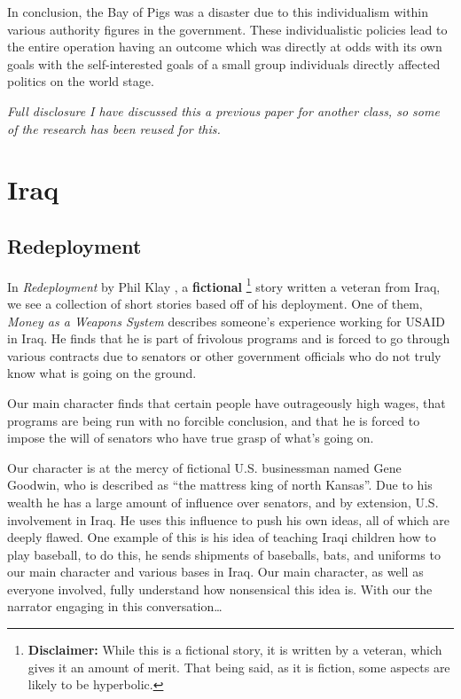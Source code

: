 \documentclass[12pt, draft]{article}
\begin{document}
    In conclusion, the Bay of Pigs was a disaster due to this individualism within various authority figures in the government. These individualistic policies lead to the entire operation having an outcome which was directly at odds with its own goals with the self-interested goals of a small group individuals directly affected politics on the world stage.  

    \textit{Full disclosure I have discussed this a previous paper for another class, so some of the research has been reused for this.}

\section{Iraq}

    \subsection{Redeployment}
        In \textit{Redeployment} by Phil Klay \parencite{Klay2014}, a \textbf{fictional} \footnote{\textbf{Disclaimer:} While this is a fictional story, it is written by a veteran, which gives it an amount of merit. That being said, as it is fiction, some aspects are likely to be hyperbolic.} 
        story written a veteran from Iraq, we see a collection of short stories based off of his deployment. One of them, \textit{Money as a Weapons System} describes someone's experience working for USAID in Iraq. He finds that he is part of frivolous programs and is forced to  go through various contracts due to senators or other government officials who do not truly know what is going on the ground. 

        Our main character finds that certain people have outrageously high wages, that programs are being run with no forcible conclusion, and that he is forced to impose the will of senators who have true grasp of what's going on. 

        Our character is at the mercy of fictional U.S. businessman named Gene Goodwin, who is described as ``the mattress king of north Kansas''. Due to his wealth he has a large amount of influence over senators, and by extension, U.S. involvement in Iraq. He uses this influence to push his own ideas, all of which are deeply flawed. One example of this is his idea of teaching Iraqi children how to play baseball, to do this, he sends shipments of baseballs, bats, and uniforms to our main character and various bases in Iraq. Our main character, as well as everyone involved, fully understand how nonsensical this idea is. With our the narrator engaging in this conversation\ldots
        
\end{document}
